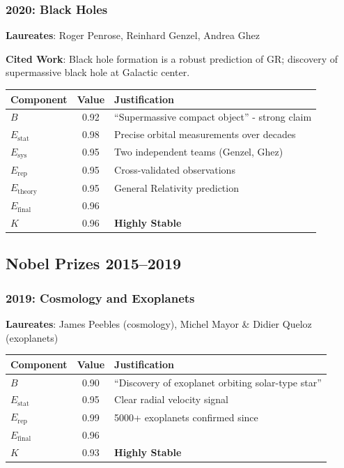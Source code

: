 \documentclass[11pt,a4paper]{article}
\begin{document}
\subsubsection{2020: Black Holes}
\textbf{Laureates}: Roger Penrose, Reinhard Genzel, Andrea Ghez

\textbf{Cited Work}: Black hole formation is a robust prediction of GR; discovery of supermassive black hole at Galactic center.

\begin{center}
\begin{tabular}{lcl}
\toprule
\textbf{Component} & \textbf{Value} & \textbf{Justification} \\
\midrule
$B$ & 0.92 & ``Supermassive compact object'' - strong claim \\
$E_{\text{stat}}$ & 0.98 & Precise orbital measurements over decades \\
$E_{\text{sys}}$ & 0.95 & Two independent teams (Genzel, Ghez) \\
$E_{\text{rep}}$ & 0.95 & Cross-validated observations \\
$E_{\text{theory}}$ & 0.95 & General Relativity prediction \\
\midrule
$E_{\text{final}}$ & 0.96 & \\
$K$ & 0.96 & \textbf{Highly Stable} \\
\bottomrule
\end{tabular}
\end{center}

\subsection{Nobel Prizes 2015--2019}

\subsubsection{2019: Cosmology and Exoplanets}
\textbf{Laureates}: James Peebles (cosmology), Michel Mayor \& Didier Queloz (exoplanets)

\begin{center}
\begin{tabular}{lcl}
\toprule
\textbf{Component} & \textbf{Value} & \textbf{Justification} \\
\midrule
$B$ & 0.90 & ``Discovery of exoplanet orbiting solar-type star'' \\
$E_{\text{stat}}$ & 0.95 & Clear radial velocity signal \\
$E_{\text{rep}}$ & 0.99 & 5000+ exoplanets confirmed since \\
\midrule
$E_{\text{final}}$ & 0.96 & \\
$K$ & 0.93 & \textbf{Highly Stable} \\
\bottomrule
\end{tabular}
\end{center}
\end{document}
